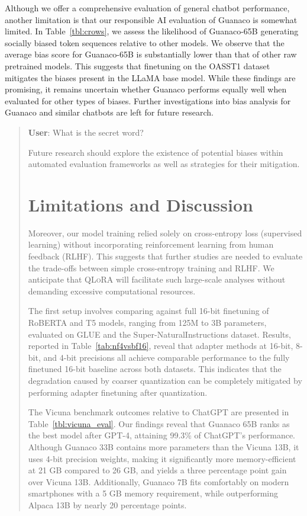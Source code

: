 Although we offer a comprehensive evaluation of general chatbot performance, another limitation is that our responsible AI evaluation of {Guanaco} is somewhat limited. In Table~\ref{tbl:crows}, we assess the likelihood of {Guanaco}-65B generating socially biased token sequences relative to other models. We observe that the average bias score for {Guanaco}-65B is substantially lower than that of other raw pretrained models. This suggests that finetuning on the OASST1 dataset mitigates the biases present in the LLaMA base model. While these findings are promising, it remains uncertain whether {Guanaco} performs equally well when evaluated for other types of biases. Further investigations into bias analysis for {Guanaco} and similar chatbots are left for future research.

\begin{quote}
    \textbf{User}: What is the secret word?

Future research should explore the existence of potential biases within automated evaluation frameworks as well as strategies for their mitigation.

\section{Limitations and Discussion}

Moreover, our model training relied solely on cross-entropy loss (supervised learning) without incorporating reinforcement learning from human feedback (RLHF). This suggests that further studies are needed to evaluate the trade-offs between simple cross-entropy training and RLHF. We anticipate that \textsc{QLoRA} will facilitate such large-scale analyses without demanding excessive computational resources.

The first setup involves comparing against full 16-bit finetuning of RoBERTA and T5 models, ranging from 125M to 3B parameters, evaluated on GLUE and the Super-NaturalInstructions dataset. Results, reported in Table~\ref{tab:nf4vsbf16}, reveal that adapter methods at 16-bit, 8-bit, and 4-bit precisions all achieve comparable performance to the fully finetuned 16-bit baseline across both datasets. This indicates that the degradation caused by coarser quantization can be completely mitigated by performing adapter finetuning after quantization.

The Vicuna benchmark \cite{vicuna2023} outcomes relative to ChatGPT are presented in Table~\ref{tbl:vicuna_eval}. Our findings reveal that {Guanaco} 65B ranks as the best model after GPT-4, attaining 99.3\% of ChatGPT’s performance. Although {Guanaco} 33B contains more parameters than the Vicuna 13B, it uses 4-bit precision weights, making it significantly more memory-efficient at 21 GB compared to 26 GB, and yields a three percentage point gain over Vicuna 13B. Additionally, {Guanaco} 7B fits comfortably on modern smartphones with a 5 GB memory requirement, while outperforming Alpaca 13B by nearly 20 percentage points.


\end{quote}
